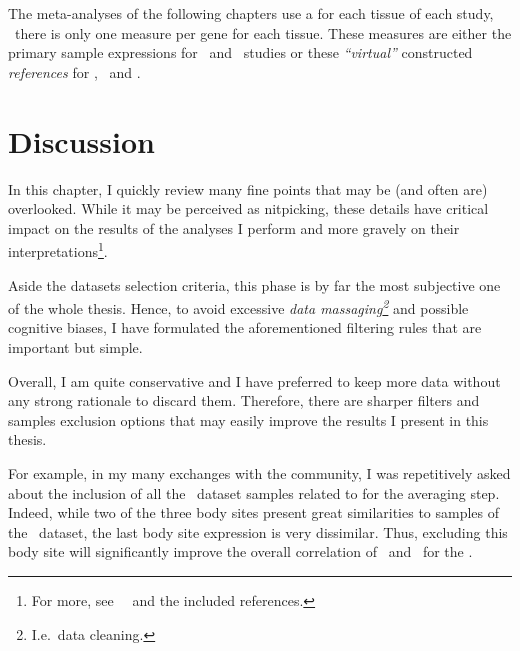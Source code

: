 The meta-analyses of the following chapters use
a  for each tissue of each study, \ie\
there is only one measure per gene for each tissue.
These measures are either
the primary sample expressions for \castle\ and \ibm\ studies or
these \emph{\enquote{virtual}} constructed \emph{references}
for \brawand, \uhlen\ and \gtex.



\section{Discussion}

In this chapter, I quickly review many fine points that
may be (and often are) overlooked.
While it may be perceived as nitpicking,
these details have critical impact on the results of the analyses
I perform and more gravely on their interpretations\footnote{%
For more, see~~
and the included references.}.

Aside the datasets selection criteria,
this phase is by far the most subjective one of the whole thesis.
Hence, to avoid excessive \emph{data massaging\footnote{I.e.\ data cleaning.}}
and possible cognitive biases,
I have formulated the aforementioned filtering rules
that are important but simple.

Overall, I am quite conservative and I have preferred to keep more data
without any strong rationale to discard them.
Therefore, there are sharper filters and samples exclusion options that
may easily improve the results I present in this thesis.

For example, in my many exchanges with the community,
I was repetitively asked about the inclusion of all the \gtex\ dataset samples
related to  for the averaging step.
Indeed, while two of the three body sites present great similarities
to \tissue{Oesophagus} samples of the \uhlen\ dataset,
the last body site expression is very dissimilar.
Thus, excluding this body site will significantly improve
the overall correlation of \gtex\ and \uhlen\ for the \Oesophagus.

